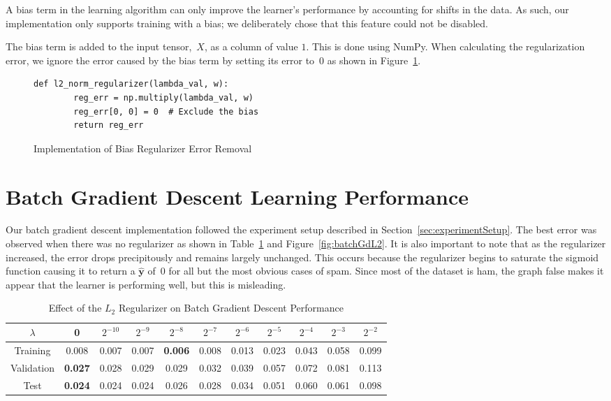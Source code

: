 \documentclass{report}
\newcommand{\yhat}{\hat{\mathbf{y}}}
\begin{document}
  A bias term in the learning algorithm can only improve the learner's performance by accounting for shifts in the data.  As such, our implementation only supports training with a bias; we deliberately chose that this feature could not be disabled.  
  
  The bias term is added to the input tensor,~$X$, as a column of value $1$.  This is done using NumPy.  When calculating the regularization error, we ignore the error caused by the bias term by setting its error to~$0$ as shown in Figure~\ref{fig:codeBiasRegularizerRemoval}.
  
  \begin{figure}[tb]
    \begin{lstlisting}[frame=single] 
      def l2_norm_regularizer(lambda_val, w):
        reg_err = np.multiply(lambda_val, w)
        reg_err[0, 0] = 0  # Exclude the bias
        return reg_err
    \end{lstlisting}
    \caption{Implementation of Bias Regularizer Error Removal}\label{fig:codeBiasRegularizerRemoval}
  \end{figure}

  \section{Batch Gradient Descent Learning Performance}\label{sec:batchGradientDescent}
  
  Our batch gradient descent implementation followed the experiment setup described in Section~\ref{sec:experimentSetup}.  The best error was observed when there was no regularizer as shown in Table~\ref{tab:batchGradientDescentL2} and Figure~\ref{fig:batchGdL2}.  It is also important to note that as the regularizer increased, the error drops precipitously and remains largely unchanged.  This occurs because the regularizer begins to saturate the sigmoid function causing it to return a $\yhat$ of~$0$ for all but the most obvious cases of spam.  Since most of the dataset is ham, the graph false makes it appear that the learner is performing well, but this is misleading.
    
  \begin{table}[]
    \centering
    \caption{Effect of the $L_2$ Regularizer on Batch Gradient Descent Performance}
    \label{tab:batchGradientDescentL2}
    \begin{tabular}{c||c|c|c|c|c|c|c|c|c|c}
      \hline
      $\lambda$  & 0              & $2^{-10}$ & $2^{-9}$ & $2^{-8}$       & $2^{-7}$ & $2^{-6}$ & $2^{-5}$ & $2^{-4}$ & $2^{-3}$ & $2^{-2}$ \\ \hline
      Training   & 0.008          & 0.007     & 0.007    & \textbf{0.006} & 0.008    & 0.013    & 0.023    & 0.043    & 0.058    & 0.099    \\ \hline
      Validation & \textbf{0.027} & 0.028    & 0.029    & 0.029          & 0.032    & 0.039    & 0.057    & 0.072    & 0.081    & 0.113    \\ \hline
      Test       & \textbf{0.024} & 0.024     & 0.024    & 0.026          & 0.028    & 0.034    & 0.051    & 0.060    & 0.061    & 0.098    \\ \hline
    \end{tabular}
  \end{table}
\end{document}
